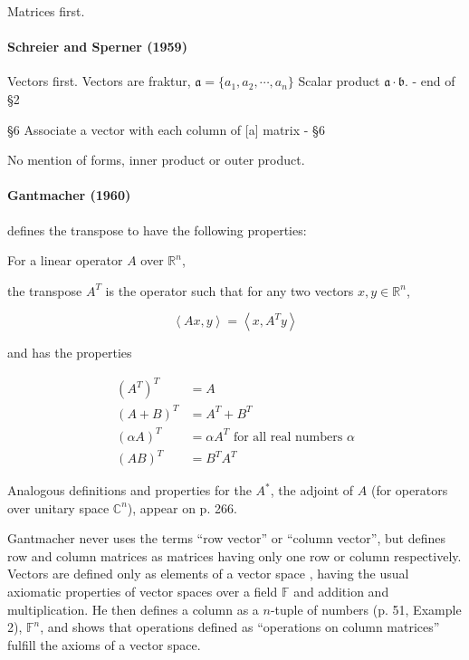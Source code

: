 Matrices first.

\paragraph{Schreier and Sperner (1959)~\cite{Schreier1959}}

Vectors first.
Vectors are fraktur, $\mathfrak a = \{a_1, a_2, \cdots, a_n\}$
Scalar product $\mathfrak a \cdot \mathfrak b$. - end of \S 2

\S6 Associate a vector with each column of [a] matrix - \S 6

No mention of forms, inner product or outer product.




\paragraph{Gantmacher (1960)~\cite{Gantmacher1960}}

\cite[p. 280, Definition 10]{Gantmacher1960} defines the transpose to have the following properties:

For a linear operator $A$ over $\mathbb R^n$,

the transpose $A^T$ is the operator such that for any two vectors $x, y \in \mathbb R^n$,

\[
\left\langle Ax, y \right\rangle = \left\langle x, A^T y \right\rangle
\]

and has the properties

\begin{align}
(A^T)^T & = A \\
(A + B)^T & = A^T + B^T \\
(\alpha A)^T & = \alpha A^T \textrm{ for all real numbers } \alpha \\
(A B)^T & = B^T A^T
\end{align}

Analogous definitions and properties for the $A^*$, the adjoint of $A$ (for operators over unitary space $\mathbb C^n$), appear on p. 266.

Gantmacher never uses the terms ``row vector'' or ``column vector'', but defines row and column matrices as matrices having only one row or column respectively. Vectors are defined only as elements of a vector space \cite[p. 51]{Gantmacher1960}, having the usual axiomatic properties of vector spaces over a field $\mathbb F$ and addition and multiplication. He then defines a column as a $n$-tuple of numbers (p. 51, Example 2), $\mathbb F^n$, and shows that operations defined as ``operations on column matrices'' fulfill the axioms of a vector space.

